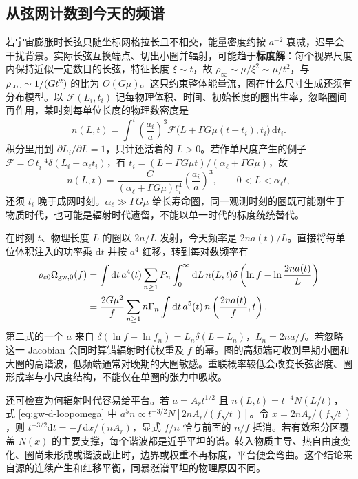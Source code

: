 \subsection{从弦网计数到今天的频谱}

若宇宙膨胀时长弦只随坐标网格拉长且不相交，能量密度约按 $a^{-2}$ 衰减，迟早会干扰背景。实际长弦互换端点、切出小圈并辐射，可能趋于\textbf{标度解}：每个视界尺度内保持近似一定数目的长弦，特征长度 $\xi\sim t$，故 $\rho_\infty\sim\mu/\xi^2\sim\mu/t^2$，与 $\rho_{\rm tot}\sim1/(Gt^2)$ 的比为 $O(G\mu)$。这只约束整体能量流，圈在什么尺寸生成还须有分布模型。以 $\mathcal F(L_i,t_i)$ 记每物理体积、时间、初始长度的圈出生率，忽略圈间再作用，某时刻每单位长度的物理数密度是
\begin{equation}\label{eq:gw-d-loopnumber}
 n(L,t)=\int^t
 \left(\frac{a_i}{a}\right)^3
 \mathcal F\big(L+\Gamma G\mu(t-t_i),t_i\big)\,\mathrm dt_i .
\end{equation}
积分里用到 $\partial L_i/\partial L=1$，只计还活着的 $L>0$。若作单尺度产生的例子 $\mathcal F=C\,t_i^{-4}\delta(L_i-\alpha_\ell t_i)$，有 $t_i=(L+\Gamma G\mu t)/(\alpha_\ell+\Gamma G\mu)$，故
\[
 n(L,t)=\frac{C}{(\alpha_\ell+\Gamma G\mu)t_i^4}
 \left(\frac{a_i}{a}\right)^3,\qquad
 0<L<\alpha_\ell t ,
\]
还须 $t_i$ 晚于成网时刻。$\alpha_\ell\gg\Gamma G\mu$ 给长寿命圈，同一观测时刻的圈既可能刚生于物质时代，也可能是辐射时代遗留，不能以单一时代的标度统统替代。

在时刻 $t$、物理长度 $L$ 的圈以 $2n/L$ 发射，今天频率是 $2na(t)/L$。直接将每单位体积注入的功率乘 $\mathrm dt$ 并按 $a^4$ 红移，转到每对数频率有
\begin{align}
 \rho_{c0}\Omega_{{\rm gw},0}(f)
 &=\int \mathrm dt\,a^4(t)
   \sum_{n\ge1} P_n\int_0^\infty\mathrm dL\,n(L,t)
   \delta\left(\ln f-\ln\frac{2na(t)}{L}\right)\nonumber\\
 &=\frac{2G\mu^2}{f}\sum_{n\ge1}n\Gamma_n
   \int\mathrm dt\,a^5(t)\,
    n\left(\frac{2na(t)}{f},t\right).
 \label{eq:gw-d-loopomega}
\end{align}
第二式的一个 $a$ 来自 $\delta(\ln f-\ln f_n)=L_n\delta(L-L_n)$，$L_n=2na/f$。若忽略这一 Jacobian 会同时算错辐射时代权重及 $f$ 的幂。图的高频端可收到早期小圈和大圈的高谐波，低频端通常对晚期的大圈敏感。重联概率较低会改变长弦密度、圈形成率与小尺度结构，不能仅在单圈的张力中吸收。

还可检查为何辐射时代容易给平台。若 $a=A_rt^{1/2}$ 且 $n(L,t)=t^{-4}N(L/t)$，式 \eqref{eq:gw-d-loopomega} 中 $a^5 n\propto t^{-3/2}N[2nA_r/(f\sqrt t)]$。令 $x=2nA_r/(f\sqrt t)$，则 $t^{-3/2}\mathrm dt=-f\,\mathrm dx/(nA_r)$，显式 $f/n$ 恰与前面的 $n/f$ 抵消。若有效积分区覆盖 $N(x)$ 的主要支撑，每个谐波都是近乎平坦的谱。转入物质主导、热自由度变化、圈尚未形成或谐波截止时，边界或权重不再标度，平台便会弯曲。这个结论来自源的连续产生和红移平衡，同暴涨谱平坦的物理原因不同。

